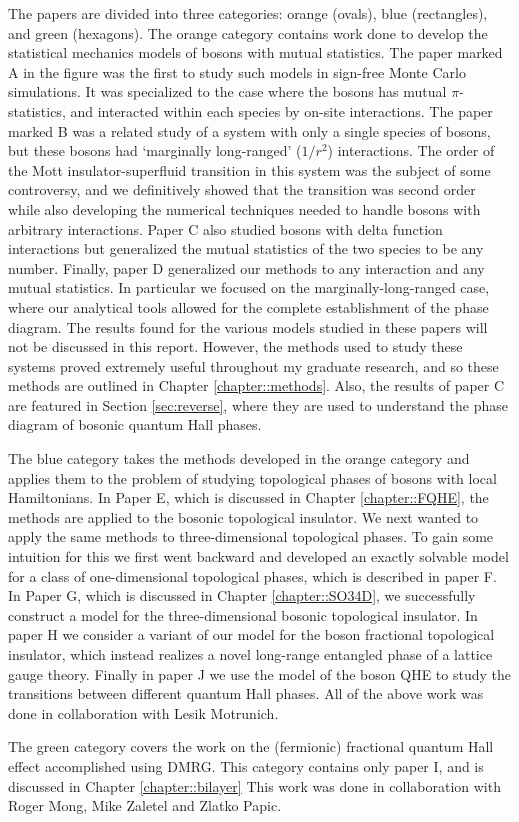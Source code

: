 The papers are divided into three categories: orange (ovals), blue (rectangles), and green (hexagons). The orange category contains work done to develop the statistical mechanics models of bosons with mutual statistics. The paper marked A \cite{Loopy} in the figure was the first to study such models in sign-free Monte Carlo simulations. It was specialized to the case where the bosons has mutual $\pi$-statistics, and interacted within each species by on-site interactions. 
The paper marked B\cite{Ranged_Loops} was a related study of a system with only a single species of bosons, but these bosons had `marginally long-ranged' ($1/r^2$) interactions. The order of the Mott insulator-superfluid transition in this system was the subject of some controversy, and we definitively showed that the transition was second order while also developing the numerical techniques needed to handle bosons with arbitrary interactions. 
Paper C\cite{short_range3} also studied bosons with delta function interactions but generalized the mutual statistics of the two species to be any number.
Finally, paper D\cite{Gen2Loops} generalized our methods to any interaction and any mutual statistics. In particular we focused on the marginally-long-ranged case, where our analytical tools allowed for the complete establishment of the phase diagram. The results found for the various models studied in these papers will not be discussed in this report. However, the methods used to study these systems proved extremely useful throughout my graduate research, and so these methods are outlined in Chapter \ref{chapter::methods}. Also, the results of paper C are featured in Section \ref{sec:reverse}, where they are used to understand the phase diagram of bosonic quantum Hall phases.

The blue category takes the methods developed in the orange category and applies them to the problem of studying topological phases of bosons with local Hamiltonians. In Paper E\cite{FQHE}, which is discussed in Chapter \ref{chapter::FQHE}, the methods are applied to the bosonic topological insulator. We next wanted to apply the same methods to three-dimensional topological phases. To gain some intuition for this we first went backward and developed an exactly solvable model for a class of one-dimensional topological phases, which is described in paper F\cite{1DSPT}. In Paper G\cite{SO34D}, which is discussed in Chapter \ref{chapter::SO34D}, we successfully construct a model for the three-dimensional bosonic topological insulator. In paper H\cite{FracFaraday} we consider a variant of our model for the boson fractional topological insulator, which instead realizes a novel long-range entangled phase of a lattice gauge theory. Finally in paper J\cite{JongYeon} we use the model of the boson QHE to study the transitions between different quantum Hall phases. All of the above work was done in collaboration with Lesik Motrunich.

The green category covers the work on the (fermionic) fractional quantum Hall effect accomplished using DMRG. This category contains only paper I\cite{bilayer}, and is discussed in Chapter \ref{chapter::bilayer} This work was done in collaboration with Roger Mong, Mike Zaletel and Zlatko Papic.
